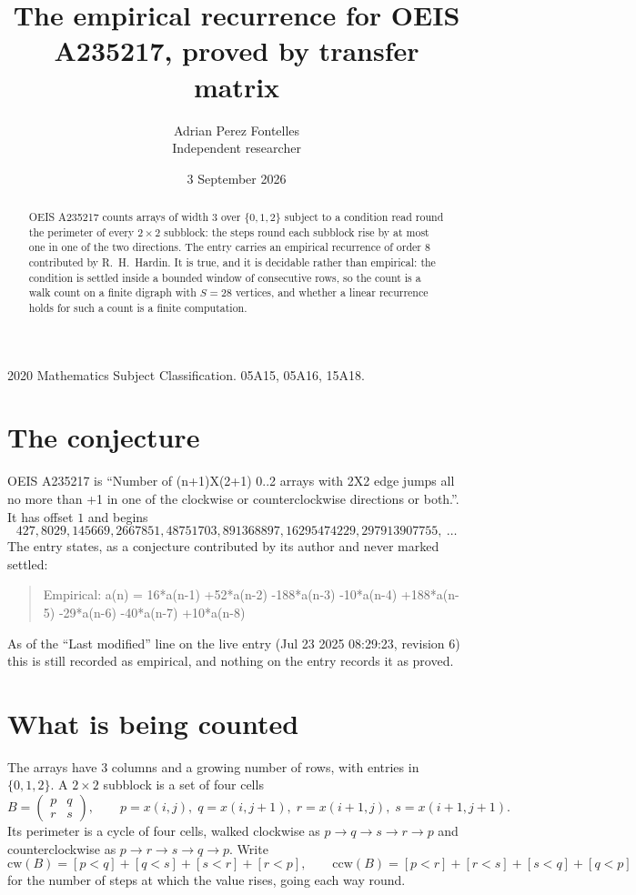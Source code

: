 \documentclass[11pt,a4paper]{article}
\title{The empirical recurrence for OEIS A235217, proved by transfer matrix}
\author{Adrian Perez Fontelles\\ \small Independent researcher}
\date{3 September 2026}
\theoremstyle{plain}
\theoremstyle{definition}
\begin{document}
\maketitle

\begin{abstract}
OEIS A235217 counts arrays of width $3$ over $\{0,1,2\}$ subject to a condition read round the
perimeter of every $2\times2$ subblock: the steps round each subblock rise by at most one in one of the two directions. The entry carries an empirical recurrence of
order $8$ contributed by R.~H.~Hardin. It is true, and it is decidable rather than
empirical: the condition is settled inside a bounded window of consecutive rows, so the
count is a walk count on a finite digraph with $S=28$ vertices, and whether a linear
recurrence holds for such a count is a finite computation.
\end{abstract}

\noindent\small 2020 Mathematics Subject Classification. 05A15, 05A16, 15A18.\normalsize

\section{The conjecture}

OEIS A235217 is ``Number of (n+1)X(2+1) 0..2 arrays with 2X2 edge jumps all no more than +1 in one of the clockwise or counterclockwise directions or both.''. It has offset $1$ and begins
\[
427, 8029, 145669, 2667851, 48751703, 891368897, 16295474229, 297913907755,\ \dots
\]
The entry states, as a conjecture contributed by its author and never marked settled:
\begin{quote}
Empirical: a(n) = 16*a(n-1) +52*a(n-2) -188*a(n-3) -10*a(n-4) +188*a(n-5) -29*a(n-6) -40*a(n-7) +10*a(n-8)
\end{quote}
As of the ``Last modified'' line on the live entry (Jul 23 2025 08:29:23, revision 6) this is still
recorded as empirical, and nothing on the entry records it as proved.

\section{What is being counted}

The arrays have $3$ columns and a growing number of rows, with entries in $\{0,1,2\}$. A
$2\times2$ subblock is a set of four cells
\[
B=\begin{pmatrix} p & q \\ r & s \end{pmatrix},
\qquad p=x(i,j),\; q=x(i,j+1),\; r=x(i+1,j),\; s=x(i+1,j+1).
\]
Its perimeter is a cycle of four cells, walked clockwise as $p\to q\to s\to r\to p$ and
counterclockwise as $p\to r\to s\to q\to p$. Write
\[
\mathrm{cw}(B)=[p<q]+[q<s]+[s<r]+[r<p],\qquad
\mathrm{ccw}(B)=[p<r]+[r<s]+[s<q]+[q<p]
\]
for the number of steps at which the value rises, going each way round.
\end{document}
